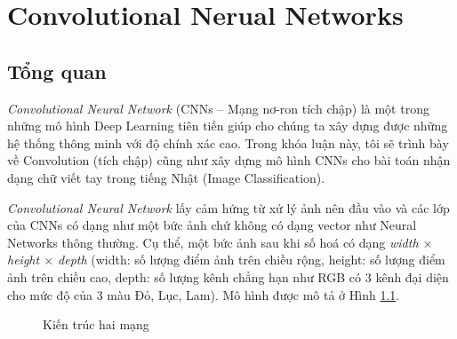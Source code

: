 \chapter{Convolutional Nerual Networks}
\label{chap:chap4}

\section{Tổng quan}
\hspace{5mm} \textit{Convolutional Neural Network }(CNNs – Mạng nơ-ron tích chập) là một trong những mô hình Deep Learning tiên tiến giúp cho chúng ta xây dựng được những hệ thống thông minh với độ chính xác cao. Trong khóa luận này, tôi sẽ trình bày về  Convolution (tích chập) cũng như xây dựng mô hình CNNs cho bài toán nhận dạng chữ viết tay trong tiếng Nhật (Image Classification).\par
\textit{Convolutional Neural Network } lấy cảm hứng từ xử lý ảnh nên đầu vào và các lớp của CNNs có dạng như một bức ảnh chứ không có dạng vector như Neural Networks thông thường. Cụ thể, một bức ảnh sau khi số hoá có dạng \textit{width $\times$ height $\times$ depth} (width: số lượng điểm ảnh trên chiều rộng, height: số lượng điểm ảnh trên chiều cao, depth: số lượng kênh chẳng hạn như RGB có 3 kênh đại diện cho mức độ của 3 màu Đỏ, Lục, Lam). Mô hình được mô tả ở Hình \ref{fig:conv}.

\begin{center}
\begin{figure}[H]

\begin{center}
  \label{fig:conv}
\caption{Kiến trúc hai mạng}
\end{center}

\end{figure}
\end{center}

